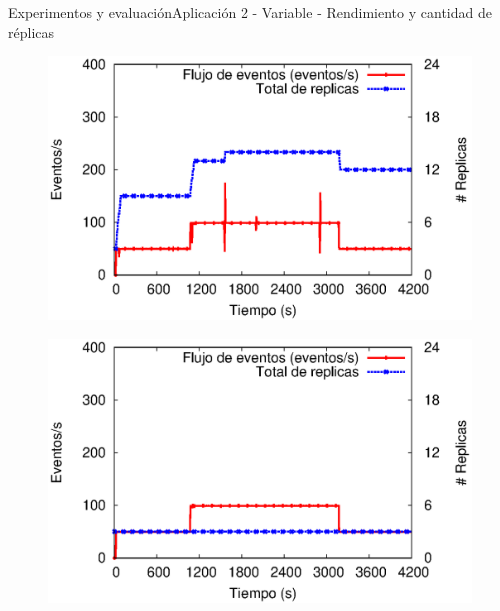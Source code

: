 
\begin{frame}{Experimentos y evaluación}{Aplicación 2 - Variable - Rendimiento y cantidad de réplicas}

\begin{multicols}{2}
\begin{figure}[p]
	\centering
	\includegraphics[scale=0.4]{images/exp/app2/normal/cm/processSystem.eps}
\end{figure}

\begin{figure}[p]
	\centering
	\includegraphics[scale=0.4]{images/exp/app2/normal/sm/processSystem.eps}
\end{figure}
\end{multicols}
\end{frame}

